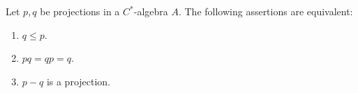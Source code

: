 Let $p, q$ be projections in a $C^*$-algebra $A$. The following assertions are equivalent:
\begin{enumerate}
  \item[(a)] $q \leq p$.
  \item[(b)] $pq = qp = q$.
  \item[(c)] $p - q$ is a projection.
\end{enumerate}
